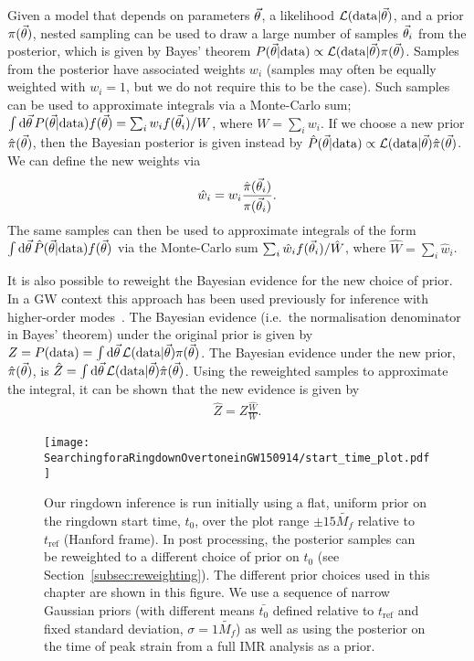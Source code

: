 Given a model that depends on parameters $\vec{\theta}$, a likelihood $\mathcal{L}(\mathrm{data}|\vec{\theta})$, and a prior $\pi(\vec{\theta})$, nested sampling can be used to draw a large number of samples $\vec{\theta}_i$ from the posterior, which is given by Bayes' theorem $P(\vec{\theta}|\mathrm{data})\propto \mathcal{L}(\mathrm{data}|\vec{\theta}) \pi(\vec{\theta})$.
Samples from the posterior have associated weights $w_i$ (samples may often be equally weighted with $w_i=1$, but we do not require this to be the case). 
Such samples can be used to approximate integrals via a Monte-Carlo sum; $\int \mathrm{d}\vec{\theta}\,P(\vec{\theta}|\mathrm{data})f(\vec{\theta})=\sum_{i}w_i f(\vec{\theta}_i)/W$, where $W=\sum_{i}w_i$.
If we choose a new prior $\hat{\pi}(\vec{\theta})$, then the Bayesian posterior is given instead by $\hat{P}(\vec{\theta}|\mathrm{data})\propto \mathcal{L}(\mathrm{data}|\vec{\theta}) \hat{\pi}(\vec{\theta})$.
We can define the new weights via
\begin{align}
	\hat{w}_i = w_i \frac{\hat{\pi}(\vec{\theta}_i)}{\pi(\vec{\theta}_i)}.
\end{align}
The same samples can then be used to approximate integrals of the form $\int \mathrm{d}\vec{\theta}\,\hat{P}(\vec{\theta}|\mathrm{data})f(\vec{\theta})$ via the Monte-Carlo sum $\sum_{i}\hat{w}_i f(\vec{\theta}_i)/\hat{W}$, where $\hat{W}=\sum_{i}\hat{w}_i$.

It is also possible to reweight the Bayesian evidence for the new choice of prior.
In a GW context this approach has been used previously for inference with higher-order modes~\cite{Payne:2019wmy}.
The Bayesian evidence (i.e.\ the normalisation denominator in Bayes' theorem) under the original prior is given by $Z=P(\mathrm{data})=\int\mathrm{d}\vec{\theta}\,\mathcal{L}(\mathrm{data}|\vec{\theta})\pi(\vec{\theta})$.
The Bayesian evidence under the new prior, $\hat{\pi}(\vec{\theta})$, is $\hat{Z}=\int\mathrm{d}\vec{\theta}\,\mathcal{L}(\mathrm{data}|\vec{\theta})\hat{\pi}(\vec{\theta})$. Using the reweighted samples to approximate the integral, it can be shown that the new evidence is given by
\begin{align}\label{eq:new_evidence}
	\hat{Z} = Z\frac{\hat{W}}{W}.
\end{align}

\begin{figure}[t]
    \centering
    \texttt{[image: SearchingforaRingdownOvertoneinGW150914/start\_time\_plot.pdf]}
    \caption[Different prior choices for the ringdown start time used for the GW150914 analysis]{ 
    Our ringdown inference is run initially using a flat, uniform prior on the ringdown start time, $t_0$, over the plot range $\pm 15 \tilde{M_f}$ relative to $t_\mathrm{ref}$ (Hanford frame).
    In post processing, the posterior samples can be reweighted to a different choice of prior on $t_0$ (see Section~\ref{subsec:reweighting}). 
    The different prior choices used in this chapter are shown in this figure. 
    We use a sequence of narrow Gaussian priors (with different means $\bar{t_0}$ defined relative to $t_\mathrm{ref}$ and fixed standard deviation, $\sigma=1\tilde{M_f}$) as well as using the posterior on the time of peak strain from a full IMR analysis as a prior.
    }
    \label{fig:start_time}
\end{figure}

